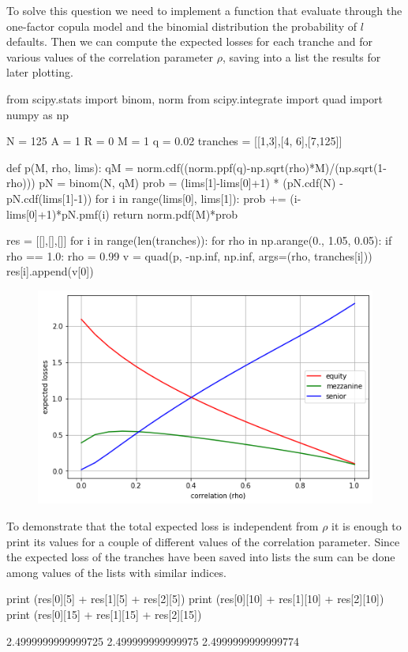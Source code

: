 \cprotEnv\begin{solution}	
To solve this question we need to implement a function that evaluate through the one-factor copula model and the binomial distribution the probability of $l$ defaults.
Then we can compute the expected losses for each tranche and for various values of the correlation parameter $\rho$, saving into a list the results for later plotting.

\begin{ipython}
from scipy.stats import binom, norm
from scipy.integrate import quad
import numpy as np

N = 125
A = 1
R = 0
M = 1
q = 0.02
tranches = [[1,3],[4, 6],[7,125]]

def p(M, rho, lims):
    qM = norm.cdf((norm.ppf(q)-np.sqrt(rho)*M)/(np.sqrt(1-rho)))
    pN = binom(N, qM)
    prob = (lims[1]-lims[0]+1) * (pN.cdf(N) - pN.cdf(lims[1]-1))
    for i in range(lims[0], lims[1]):
        prob += (i-lims[0]+1)*pN.pmf(i)
    return norm.pdf(M)*prob

res = [[],[],[]]
for i in range(len(tranches)):
    for rho in np.arange(0., 1.05, 0.05):
        if rho == 1.0:
            rho = 0.99
        v = quad(p, -np.inf, np.inf, args=(rho, tranches[i]))
        res[i].append(v[0])
\end{ipython}

\begin{figure}[htbp]
	\begin{center}		
		\includegraphics[width=0.7\linewidth]{figures/losses_vs_rho_2}
	\end{center}
\end{figure}

To demonstrate that the total expected loss is independent from $\rho$ it is enough to print its values for a couple of different values of the correlation parameter. Since the expected loss of the tranches have been saved into lists the sum can be done among values of the lists with similar indices. 

\begin{ipython}
print (res[0][5] + res[1][5] + res[2][5])
print (res[0][10] + res[1][10] + res[2][10])
print (res[0][15] + res[1][15] + res[2][15])
\end{ipython}
\begin{ioutput}
2.4999999999999725
2.499999999999975
2.4999999999999774
\end{ioutput}
\end{solution}

